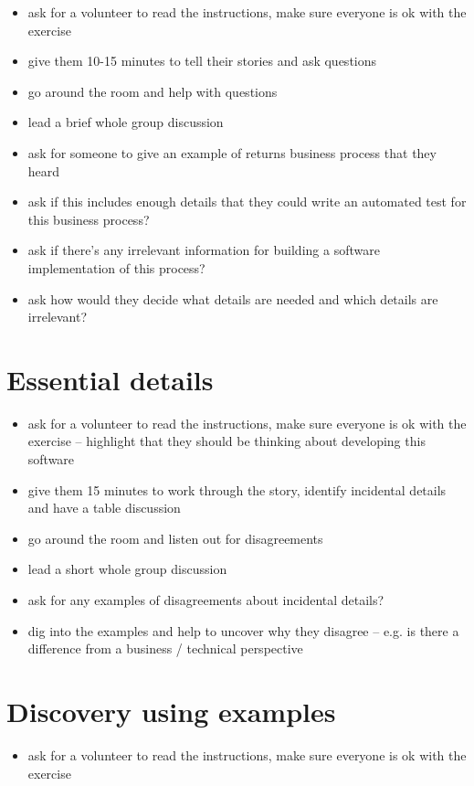 \begin{itemize}
    \item ask for a volunteer to read the instructions, make sure everyone is ok with the exercise
    \item give them 10-15 minutes to tell their stories and ask questions
    \item go around the room and help with questions
    \item lead a brief whole group discussion
    \item ask for someone to give an example of returns business process that they heard
    \item ask if this includes enough details that they could write an automated test for this business process?
    \item ask if there's any irrelevant information for building a software implementation of this process?
    \item ask how would they decide what details are needed and which details are irrelevant?
\end{itemize}

\section*{Essential details}

\begin{itemize}
    \item ask for a volunteer to read the instructions, make sure everyone is ok with the exercise – highlight that they should be thinking about developing this software
    \item give them 15 minutes to work through the story, identify incidental details and have a table discussion
    \item go around the room and listen out for disagreements
    \item lead a short whole group discussion
    \item ask for any examples of disagreements about incidental details?
    \item dig into the examples and help to uncover why they disagree – e.g. is there a difference from a business / technical perspective
\end{itemize}

\section*{Discovery using examples}

\begin{itemize}
    \item ask for a volunteer to read the instructions, make sure everyone is ok with the exercise
\end{itemize}